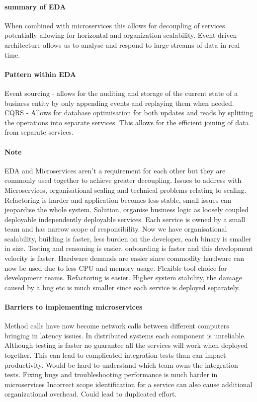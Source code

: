 \documentclass[a4paper, 11pt]{book}
\begin{document}
    \paragraph{summary of EDA}
    When combined with microservices this allows for decoupling of services potentially allowing for horizontal and organization scalability.
    Event driven architecture allows us to analyse and respond to large streams of data in real time.

    \paragraph{Pattern within EDA}
    Event sourcing - allows for the auditing and storage of the current state of a business entity by only appending events and replaying them when needed.
    CQRS - Allows for database optimisation for both updates and reads by splitting the operations into separate services.
    This allows for the efficient joining of data from separate services.

    \paragraph{Note} EDA and Microservices aren't a requirement for each other but they are commonly used together to achieve greater decoupling.
    Issues to address with Microservices, organisational scaling and technical problems relating to scaling.
    Refactoring is harder and application becomes less stable, small issues can jeopardise the whole system.
    Solution, organise business logic as loosely coupled deployable independently deployable services.
    Each service is owned by a small team and has narrow scope of responsibility.
    Now we have organisational scalability, building is faster, less burden on the developer, each binary is smaller in size.
    Testing and reasoning is easier, onboarding is faster and this development velocity is faster.
    Hardware demands are easier since commodity hardware can now be used due to less CPU and memory usage.
    Flexible tool choice for development teams.
    Refactoring is easier.
    Higher system stability, the damage caused by a bug etc is much smaller since each service is deployed separately.

    \paragraph{Barriers to implementing microservices}
    Method calls have now become network calls between different computers bringing in latency issues.
    In distributed systems each component is unreliable.
    Although testing is faster no guarantee all the services will work when deployed together.
    This can lead to complicated integration tests than can impact productivity.
    Would be hard to understand which team owns the integration tests.
    Fixing bugs and troubleshooting performance is much harder in microservices
    Incorrect scope identification for a service can also cause additional organizational overhead.
    Could lead to duplicated effort.
\end{document}

